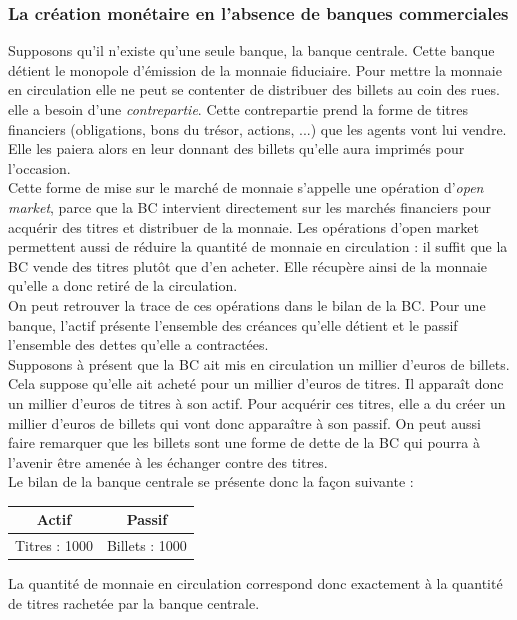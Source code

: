 \documentclass[10pt]{book}
\begin{document}
\subsubsection{La création monétaire en l'absence de banques commerciales}
Supposons qu'il n'existe qu'une seule banque, la banque centrale. Cette banque détient le monopole d'émission de la monnaie fiduciaire. Pour mettre la monnaie en circulation elle ne peut se contenter de distribuer des billets au coin des rues. elle a besoin d'une \textit{contrepartie}. Cette contrepartie prend la forme de titres financiers (obligations, bons du trésor, actions, ...) que les agents vont lui vendre. Elle les paiera alors en leur donnant des billets qu'elle aura imprimés pour l'occasion. \\
Cette forme de mise sur le marché de monnaie s'appelle une opération d'\textit{open market}, parce que la BC intervient directement sur les marchés financiers pour acquérir des titres et distribuer de la monnaie. Les opérations d'open market permettent aussi de réduire la quantité de monnaie en circulation : il suffit que la BC vende des titres plutôt que d'en acheter. Elle récupère ainsi de la monnaie qu'elle a donc retiré de la circulation. \\
On peut retrouver la trace de ces opérations dans le bilan de la BC. Pour une banque, l'actif présente l'ensemble des créances qu'elle détient et le passif l'ensemble des dettes qu'elle a contractées. \\
Supposons à présent que la BC ait mis en circulation un millier d'euros de billets. Cela suppose qu'elle ait acheté pour un millier d'euros de titres. Il apparaît donc un millier d'euros de titres à son actif. Pour acquérir ces titres, elle a du créer un millier d'euros de billets qui vont donc apparaître à son passif. On peut aussi faire remarquer que les billets sont une forme de dette de la BC qui pourra à l'avenir être amenée à les échanger contre des titres. \\
Le bilan de la banque centrale se présente donc la façon suivante : 
\begin{center} 
  \begin{tabular}{c|c}
    Actif & Passif \\
    \hline
    Titres : 1000 & Billets : 1000
  \end{tabular}
\end{center}
La quantité de monnaie en circulation correspond donc exactement à la quantité de titres rachetée par la banque centrale.
\end{document}
